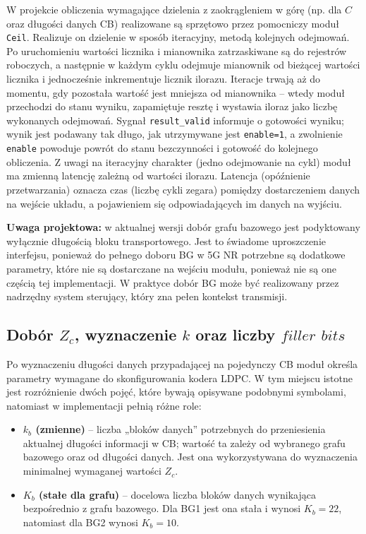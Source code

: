 W projekcie obliczenia wymagające dzielenia z zaokrągleniem w górę (np. dla $C$ oraz długości danych CB) realizowane są sprzętowo przez pomocniczy moduł \texttt{Ceil}. Realizuje on dzielenie w sposób iteracyjny, metodą kolejnych odejmowań. Po uruchomieniu  wartości licznika i mianownika zatrzaskiwane są do rejestrów roboczych, a następnie w każdym cyklu odejmuje mianownik od bieżącej wartości licznika i jednocześnie inkrementuje licznik ilorazu. Iteracje trwają aż do momentu, gdy pozostała wartość jest mniejsza od mianownika -- wtedy moduł przechodzi do stanu wyniku, zapamiętuje resztę i wystawia iloraz jako liczbę wykonanych odejmowań. Sygnał \texttt{result\_valid} informuje o gotowości wyniku; wynik jest podawany tak długo, jak utrzymywane jest \texttt{enable=1}, a zwolnienie \texttt{enable} powoduje powrót do stanu bezczynności i gotowość do kolejnego obliczenia. Z uwagi na iteracyjny charakter (jedno odejmowanie na cykl) moduł ma zmienną latencję zależną od wartości ilorazu. Latencja (opóźnienie przetwarzania) oznacza czas (liczbę cykli zegara) pomiędzy dostarczeniem danych na wejście układu, a pojawieniem się odpowiadających im danych na wyjściu.


\textbf{Uwaga projektowa:} w aktualnej wersji dobór grafu bazowego jest podyktowany wyłącznie długością bloku transportowego. Jest to świadome uproszczenie interfejsu, ponieważ do pełnego doboru BG w 5G NR potrzebne są dodatkowe parametry, które nie są dostarczane na wejściu modułu, ponieważ nie są one częścią tej implementacji. W praktyce dobór BG może być realizowany przez nadrzędny system sterujący, który zna pełen kontekst transmisji.

\subsection{Dobór $Z_c$, wyznaczenie $k$ oraz liczby $filler$ $bits$}
\label{subsec:ldpc_prep_zc_k_filler}

Po wyznaczeniu długości danych przypadającej na pojedynczy CB moduł określa parametry wymagane do skonfigurowania kodera LDPC. W tym miejscu istotne jest rozróżnienie dwóch pojęć, które bywają opisywane podobnymi symbolami, natomiast w implementacji pełnią różne role:

\begin{itemize}
  \item \textbf{$k_b$ (zmienne)} -- liczba „bloków danych” potrzebnych do przeniesienia aktualnej długości informacji w CB; wartość ta zależy od wybranego grafu bazowego oraz od długości danych. Jest ona wykorzystywana do wyznaczenia minimalnej wymaganej wartości $Z_c$.
  \item \textbf{$K_b$ (stałe dla grafu)} -- docelowa liczba bloków danych wynikająca bezpośrednio z grafu bazowego. Dla BG1 jest ona stała i wynosi $K_b=22$, natomiast dla BG2 wynosi $K_b=10$.
\end{itemize}

